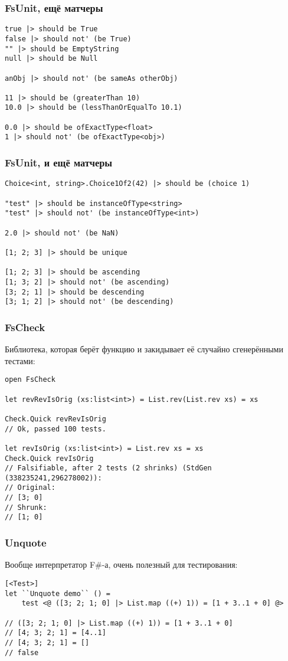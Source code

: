 \documentclass[xetex,mathserif,serif]{beamer}
\begin{document}
	\begin{frame}[fragile]
		\frametitle{FsUnit, ещё матчеры}
		\begin{verbatim}
true |> should be True
false |> should not' (be True)
"" |> should be EmptyString
null |> should be Null

anObj |> should not' (be sameAs otherObj)

11 |> should be (greaterThan 10)
10.0 |> should be (lessThanOrEqualTo 10.1)

0.0 |> should be ofExactType<float>
1 |> should not' (be ofExactType<obj>)
		\end{verbatim}
	\end{frame}

	\begin{frame}[fragile]
		\frametitle{FsUnit, и ещё матчеры}
		\begin{verbatim}
Choice<int, string>.Choice1Of2(42) |> should be (choice 1)

"test" |> should be instanceOfType<string>
"test" |> should not' (be instanceOfType<int>)

2.0 |> should not' (be NaN)

[1; 2; 3] |> should be unique

[1; 2; 3] |> should be ascending
[1; 3; 2] |> should not' (be ascending)
[3; 2; 1] |> should be descending
[3; 1; 2] |> should not' (be descending)
		\end{verbatim}
	\end{frame}

	\begin{frame}[fragile]
		\frametitle{FsCheck}
		Библиотека, которая берёт функцию и закидывает её случайно сгенерёнными тестами:
		\begin{verbatim}
open FsCheck

let revRevIsOrig (xs:list<int>) = List.rev(List.rev xs) = xs

Check.Quick revRevIsOrig
// Ok, passed 100 tests.

let revIsOrig (xs:list<int>) = List.rev xs = xs
Check.Quick revIsOrig
// Falsifiable, after 2 tests (2 shrinks) (StdGen (338235241,296278002)):
// Original:
// [3; 0]
// Shrunk:
// [1; 0]
		\end{verbatim}
	\end{frame}

	\begin{frame}[fragile]
		\frametitle{Unquote}
		Вообще интерпретатор F\#-а, очень полезный для тестирования:
		\begin{verbatim}
[<Test>]
let ``Unquote demo`` () =
    test <@ ([3; 2; 1; 0] |> List.map ((+) 1)) = [1 + 3..1 + 0] @>

// ([3; 2; 1; 0] |> List.map ((+) 1)) = [1 + 3..1 + 0]
// [4; 3; 2; 1] = [4..1]
// [4; 3; 2; 1] = []
// false
		\end{verbatim}
	\end{frame}
\end{document}
